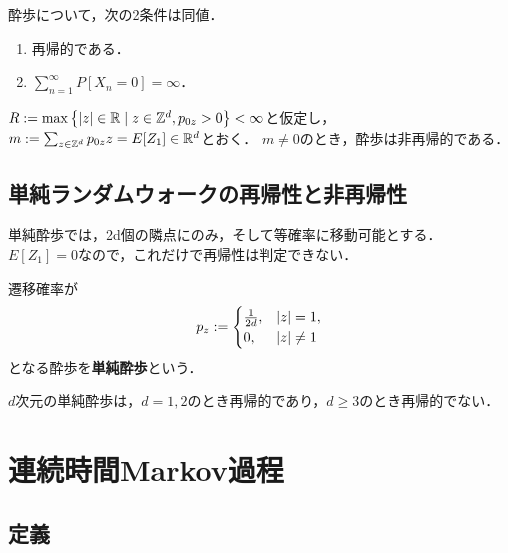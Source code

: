 \documentclass[uplatex,dvipdfmx]{jsreport}
\begin{document}
\begin{lemma}
    酔歩について，次の2条件は同値．
    \begin{enumerate}
        \item 再帰的である．
        \item $\sum^\infty_{n=1}P[X_n=0]=\infty$．
    \end{enumerate}
\end{lemma}

\begin{theorem}[非再帰性の十分条件]
    $R:=\max\left\{\lvert z\rvert\in\mathbb{R}\mid z\in\mathbb{Z}^d,p_{0z}>0\right\}<\infty$と仮定し，
    $m:=\sum_{z\in\mathbb{Z}^d}p_{0z}z=E[Z_1]\in\mathbb{R}^d$とおく．
    $m\ne0$のとき，酔歩は非再帰的である．
\end{theorem}

\subsection{単純ランダムウォークの再帰性と非再帰性}

\begin{tcolorbox}[colframe=ForestGreen, colback=ForestGreen!10!white,breakable,colbacktitle=ForestGreen!40!white,coltitle=black,fonttitle=\bfseries\sffamily,
title=]
    単純酔歩では，2d個の隣点にのみ，そして等確率に移動可能とする．
    $E[Z_1]=0$なので，これだけで再帰性は判定できない．
\end{tcolorbox}

\begin{definition}
    遷移確率が
    \[p_z:=\begin{cases}
        \frac{1}{2d},&\lvert z\rvert=1,\\
        0,&\lvert z\rvert\ne1
    \end{cases}\]
    となる酔歩を\textbf{単純酔歩}という．
\end{definition}

\begin{theorem}[Polya]
    $d$次元の単純酔歩は，$d=1,2$のとき再帰的であり，$d\ge3$のとき再帰的でない．
\end{theorem}

\section{連続時間Markov過程}

\subsection{定義}
\end{document}
